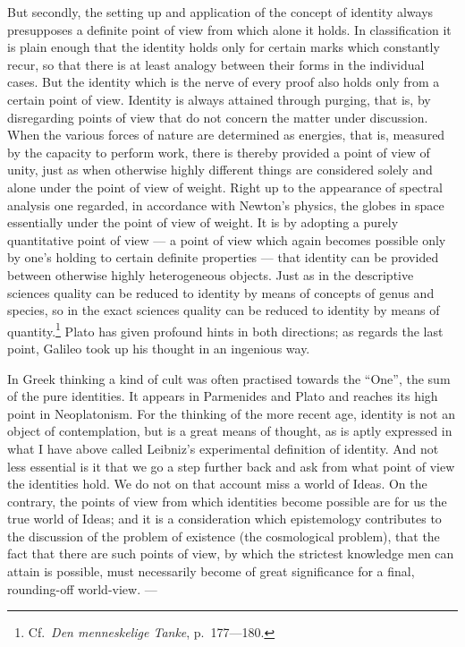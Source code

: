 \documentclass[12pt]{article}
\newcommand{\opage}[1]{\marginnote{\footnotesize\textit{[#1]}}}
\begin{document}
But secondly, the setting up and application of the concept of identity
always presupposes a definite point of view from which alone it holds. In
classification it is plain enough that the identity holds only for certain
marks which constantly recur, so that there is at least analogy between
their forms in the individual cases. But the identity which is the nerve of
every proof also holds only from a certain point of view. Identity is always
attained through purging, that is, by disregarding points of view that do
not concern the matter under discussion. When the various forces of nature
are determined as energies, that is, measured by the capacity to perform
work, there is thereby \opage{42}provided a point of view of unity, just as when
otherwise highly different things are considered solely and alone under the
point of view of weight. Right up to the appearance of spectral analysis one
regarded, in accordance with Newton's physics, the globes in space
essentially under the point of view of weight. It is by adopting a purely
quantitative point of view --- a point of view which again becomes possible
only by one's holding to certain definite properties --- that identity can
be provided between otherwise highly heterogeneous objects. Just as in the
descriptive sciences quality can be reduced to identity by means of concepts
of genus and species, so in the exact sciences quality can be reduced to
identity by means of quantity.\footnote{Cf.\ \textit{Den menneskelige
Tanke}, p.~177---180.} Plato has given profound hints in both directions; as
regards the last point, Galileo took up his thought in an ingenious way.

In Greek thinking a kind of cult was often practised towards the ``One'',
the sum of the pure identities. It appears in Parmenides and Plato and
reaches its high point in Neoplatonism. For the thinking of the more recent
age, identity is not an object of contemplation, but is a great means of
thought, as is aptly expressed in what I have above called Leibniz's
experimental definition of identity. And not less essential is it that we go
a step further back and ask from what point of view the identities hold. We
do not on that account miss a world of Ideas. On the contrary, the points of
view from which identities become possible are for us the true world of
Ideas; and it is a consideration which epistemology contributes to the
discussion of the problem of existence (the cosmological problem), that the
fact that there are such points of view, by which the strictest knowledge
men can \opage{43}attain is possible, must necessarily become of great significance
for a final, rounding-off world-view. ---
\end{document}
